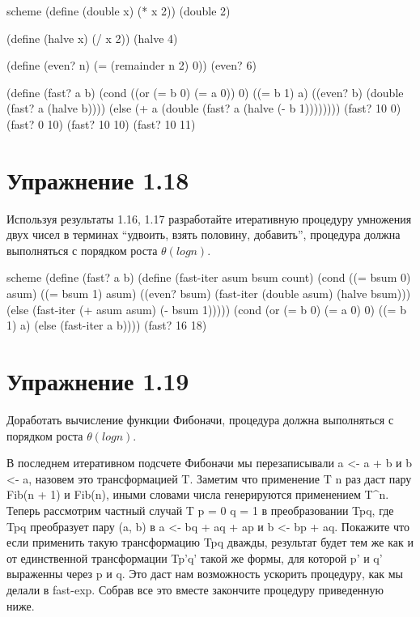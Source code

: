 \begin{codelisting}{scheme}
(define (double x)
  (* x 2))
(double 2)

(define (halve x)
  (/ x 2))
(halve 4)

(define (even? n)
  (= (remainder n 2) 0))
(even? 6)

(define (fast? a b)
  (cond ((or (= b 0) (= a 0)) 0)
        ((= b 1) a)
        ((even? b) (double (fast? a (halve b))))
        (else (+ a (double (fast? a (halve (- b 1))))))))
(fast? 10 0)
(fast? 0 10)
(fast? 10 10)
(fast? 10 11)
\end{codelisting}

\chapter{Упражнение 1.18}

Используя результаты 1.16, 1.17 разработайте итеративную процедуру умножения двух чисел в терминах ``удвоить, взять половину, добавить'', процедура должна выполняться с порядком роста $\theta(log{n})$.

\begin{codelisting}{scheme}
(define (fast? a b)
  (define (fast-iter asum bsum count)
    (cond ((= bsum 0) asum)
          ((= bsum 1) asum)
          ((even? bsum) (fast-iter (double asum) (halve bsum)))
          (else (fast-iter (+ asum asum) (- bsum 1)))))
  (cond (or (= b 0) (= a 0) 0)
        ((= b 1) a)
        (else (fast-iter a b))))
(fast? 16 18)
\end{codelisting}


\chapter{Упражнение 1.19}

Доработать вычисление функции Фибоначи, процедура должна выполняться с порядком роста $\theta(log{n})$.

В последнем итеративном подсчете Фибоначи мы перезаписывали a <- a + b и b <- a, назовем это трансформацией T. Заметим что применение T n раз даст пару Fib(n + 1) и Fib(n), иными словами числа генерируются применением T^n.
Теперь рассмотрим частный случай T p = 0 q = 1 в преобразовании Tpq, где Tpq преобразует пару (a, b) в a <- bq + aq + ap и b <- bp + aq.
Покажите что если применить такую трансформацию Tpq дважды, результат будет тем же как и от единственной трансформации Tp'q' такой же формы, для которой p' и q' выраженны через p и q.
Это даст нам возможность ускорить процедуру, как мы делали в fast-exp. Собрав все это вместе закончите процедуру приведенную ниже.

